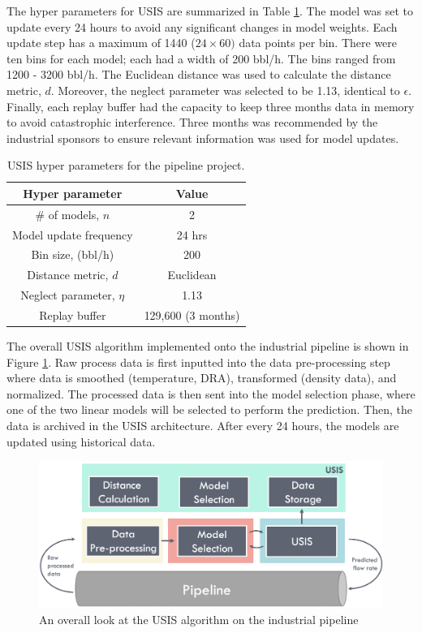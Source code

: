 The hyper parameters for USIS are summarized in Table \ref{tab:02USISHP}. The model was set to update every 24 hours to avoid any significant changes in model weights. Each update step has a maximum of 1440 ($24 \times 60)$ data points per bin. There were ten bins for each model; each had a width of 200 bbl/h.  The bins ranged from 1200 - 3200 bbl/h.  The Euclidean distance was used to calculate the distance metric, $d$.  Moreover, the neglect parameter was selected to be 1.13, identical to $\epsilon$.  Finally, each replay buffer had the capacity to keep three months data in memory to avoid catastrophic interference.  Three months was recommended by the industrial sponsors to ensure relevant information was used for model updates.

\begin{table}[h]
    \centering
    {
    \begin{tabular}{c|c}
    Hyper parameter & Value \\ \hline
    \# of models, $n$ & 2 \\
    Model update frequency & 24 hrs \\
    Bin size, (bbl/h) & 200 \\
    Distance metric, $d$ & Euclidean \\
    Neglect parameter, $\eta$ & 1.13 \\
    Replay buffer & 129,600 (3 months) \\
    \end{tabular}}
    \caption{USIS hyper parameters for the pipeline project.}
    \label{tab:02USISHP}
\end{table}

The overall USIS algorithm implemented onto the industrial pipeline is shown in Figure \ref{fig:02USISPipe}.  Raw process data is first inputted into the data pre-processing step where data is smoothed (temperature, DRA), transformed (density data), and normalized.  The processed data is then sent into the model selection phase, where one of the two linear models will be selected to perform the prediction.  Then, the data is archived in the USIS architecture.  After every 24 hours, the models are updated using historical data.

\begin{figure}[h]
    \centering
    \includegraphics[width=\textwidth]{images/ch2/02USISPipe.jpeg}
    \caption{An overall look at the USIS algorithm on the industrial pipeline}
    \label{fig:02USISPipe}
\end{figure}

